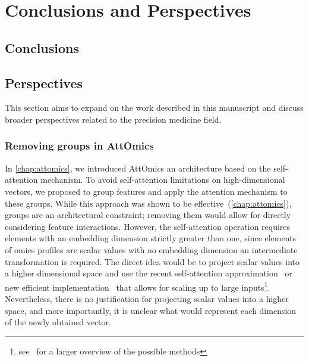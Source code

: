 \documentclass[../main.tex]{subfiles}
\begin{document}
\chapter{Conclusions and Perspectives}
\minitocpage
\section{Conclusions}
\section{Perspectives}
	This section aims to expand on the work described in this manuscript and discuss broader perspectives related to the precision medicine field.
	\subsection{Removing groups in AttOmics}\label{sec:scalar_attention}
		In \cref{chap:attomics}, we introduced AttOmics an architecture based on the self-attention mechanism.
		To avoid self-attention limitations on high-dimensional vectors, we proposed to group features and apply the attention mechanism to these groups.
		While this approach was shown to be effective~(\cref{chap:attomics}), groups are an architectural constraint; removing them would allow for directly considering feature interactions.
		However, the self-attention operation requires elements with an embedding dimension strictly greater than one, since elements of omics profiles are scalar values with no embedding dimension an intermediate transformation is required.
		The direct idea would be to project scalar values into a higher dimensional space and use the recent self-attention approximation~\cite{xiongNystrOmformerNystr2021,Linformer} or new efficient implementation~\cite{FlashAttention,rabeSelfattentionDoesNot2021,bolyaHydraAttentionEfficient2022a} that allows for scaling up to large inputs\footnote{see~\cite{EfficientTransformers} for a larger overview of the possible methods}.
		Nevertheless, there is no justification for projecting scalar values into a higher space, and more importantly, it is unclear what would represent each dimension of the newly obtained vector.
\end{document}
